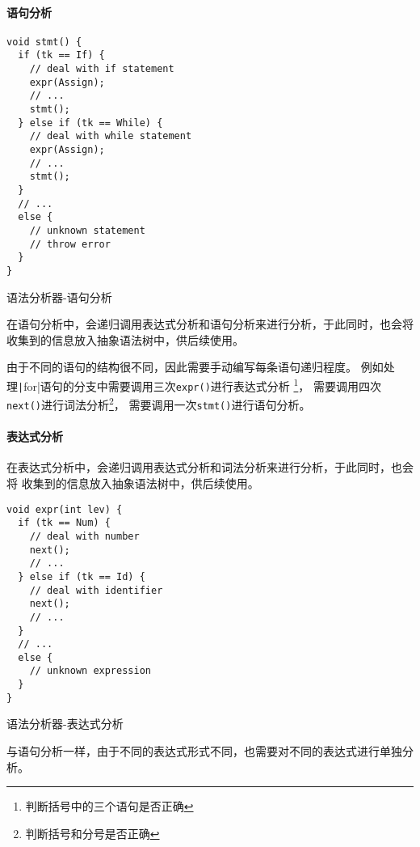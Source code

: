 \paragraph{语句分析}

\begin{listing}[hbt]
\begin{verbatim}
void stmt() {
  if (tk == If) {
    // deal with if statement
    expr(Assign);
    // ...
    stmt();
  } else if (tk == While) {
    // deal with while statement
    expr(Assign);
    // ...
    stmt();
  }
  // ...
  else {
    // unknown statement
    // throw error
  }
}
  \end{verbatim}
  \caption{语法分析器-语句分析}
\end{listing}

在语句分析中，会递归调用表达式分析和语句分析来进行分析，于此同时，也会将
收集到的信息放入抽象语法树中，供后续使用。

由于不同的语句的结构很不同，因此需要手动编写每条语句递归程度。
例如处理\texttt|for|语句的分支中需要调用三次{\tt expr()}进行表达式分析
\footnote{判断括号中的三个语句是否正确}，
需要调用四次{\tt next()}进行词法分析\footnote{判断括号和分号是否正确}，
需要调用一次{\tt stmt()}进行语句分析。

\paragraph{表达式分析}

在表达式分析中，会递归调用表达式分析和词法分析来进行分析，于此同时，也会将
收集到的信息放入抽象语法树中，供后续使用。

\begin{listing}[hbt]
  \begin{verbatim}
void expr(int lev) {
  if (tk == Num) {
    // deal with number
    next();
    // ...
  } else if (tk == Id) {
    // deal with identifier
    next();
    // ...
  }
  // ...
  else {
    // unknown expression
  }
}
  \end{verbatim}
  \caption{语法分析器-表达式分析}
\end{listing}

与语句分析一样，由于不同的表达式形式不同，也需要对不同的表达式进行单独分析。

